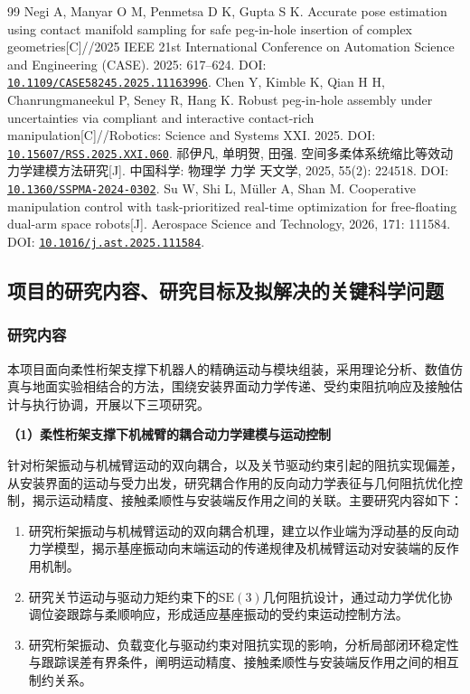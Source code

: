 \documentclass[UTF8,a4paper,zihao=-4,fontset=fandol]{ctexart}
\newcommand{\topic}[1]{\par\Needspace{4\baselineskip}\addvspace{0.5em}\noindent\textbf{#1}\par\nobreak}
\newcommand{\doi}[1]{\href{https://doi.org/#1}{\nolinkurl{#1}}}
\newcommand{\SE}{\mathrm{SE}(3)}
\begin{document}
\begin{thebibliography}{99}
 Negi A, Manyar O M, Penmetsa D K, Gupta S K. Accurate pose estimation using contact manifold sampling for safe peg-in-hole insertion of complex geometries[C]//2025 IEEE 21st International Conference on Automation Science and Engineering (CASE). 2025: 617--624. DOI: \doi{10.1109/CASE58245.2025.11163996}.
 Chen Y, Kimble K, Qian H H, Chanrungmaneekul P, Seney R, Hang K. Robust peg-in-hole assembly under uncertainties via compliant and interactive contact-rich manipulation[C]//Robotics: Science and Systems XXI. 2025. DOI: \doi{10.15607/RSS.2025.XXI.060}.
 祁伊凡, 单明贺, 田强. 空间多柔体系统缩比等效动力学建模方法研究[J]. 中国科学: 物理学 力学 天文学, 2025, 55(2): 224518. DOI: \doi{10.1360/SSPMA-2024-0302}.
 Su W, Shi L, Müller A, Shan M. Cooperative manipulation control with task-prioritized real-time optimization for free-floating dual-arm space robots[J]. Aerospace Science and Technology, 2026, 171: 111584. DOI: \doi{10.1016/j.ast.2025.111584}.
\end{thebibliography}
\endgroup

\subsection{项目的研究内容、研究目标及拟解决的关键科学问题}

\subsubsection{研究内容}

本项目面向柔性桁架支撑下机器人的精确运动与模块组装，采用理论分析、数值仿真与地面实验相结合的方法，围绕安装界面动力学传递、受约束阻抗响应及接触估计与执行协调，开展以下三项研究。

\topic{（1）柔性桁架支撑下机械臂的耦合动力学建模与运动控制}

针对桁架振动与机械臂运动的双向耦合，以及关节驱动约束引起的阻抗实现偏差，从安装界面的运动与受力出发，研究耦合作用的反向动力学表征与几何阻抗优化控制，揭示运动精度、接触柔顺性与安装端反作用之间的关联。主要研究内容如下：
\begin{enumerate}[label=\arabic*)]
  \item 研究桁架振动与机械臂运动的双向耦合机理，建立以作业端为浮动基的反向动力学模型，揭示基座振动向末端运动的传递规律及机械臂运动对安装端的反作用机制。
  \item 研究关节运动与驱动力矩约束下的$\SE$几何阻抗设计，通过动力学优化协调位姿跟踪与柔顺响应，形成适应基座振动的受约束运动控制方法。
  \item 研究桁架振动、负载变化与驱动约束对阻抗实现的影响，分析局部闭环稳定性与跟踪误差有界条件，阐明运动精度、接触柔顺性与安装端反作用之间的相互制约关系。
\end{enumerate}
\end{document}
